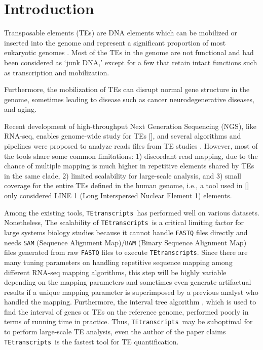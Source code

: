 \documentclass[wsdraft]{ws-procs11x85}
\newcommand{\TEtranscripts}{\texttt{TEtranscripts}}
\begin{document}
\bodymatter

\section{Introduction}\label{aba:intro}

Transposable elements (TEs) are DNA elements which can be mobilized or inserted into the genome and represent a significant proportion of most eukaryotic genomes \cite{erwin2014mobile}. 
Most of the TEs in the genome are not functional and had been considered as `junk DNA,' except for a few that retain intact functions such as transcription and mobilization.\cite{biemont2006genetics}

Furthermore, the mobilization of TEs can disrupt normal gene structure in the genome, sometimes leading to disease such as cancer \cite{belancio2008mammalian,jirtle2007environmental} neurodegenerative diseases,\cite{erwin2014mobile} and aging.\cite{wood2013chromatin} 

Recent development of high-throughput Next Generation Sequencing (NGS), like RNA-seq, enables genome-wide study for TEs [], and several algorithms and pipelines were proposed to analyze reads files from TE studies \cite{lee2012landscape,platzer2012te,helman2014somatic,henaff2015jitterbug,jin2015tetranscripts,de2017identifying,tang2017human}. However, most of the tools share some common limitations: 1) discordant read mapping, due to the chance of multiple mapping is much higher in repetitive elements shared by TEs in the same clade, 2) limited scalability for large-scale analysis, and 3) small coverage for the entire TEs defined in the human genome, i.e., a tool used in [] only considered LINE 1 (Long Interspersed Nuclear Element 1) elements.\cite{ewing2015transposable} 

Among the existing tools, \TEtranscripts~has performed well on various datasets.\cite{jin2015tetranscripts}
Nonetheless, The scalability of \TEtranscripts~is a critical limiting factor for large systems biology studies because it cannot handle \verb|FASTQ| files directly and needs \verb|SAM| (Sequence Alignment Map)/\verb|BAM| (Binary Sequence Alignment Map) files generated from raw \verb|FASTQ| files to execute \TEtranscripts. Since there are many tuning parameters on handling repetitive sequence mapping among different RNA-seq mapping algorithms, this step will be highly variable depending on the mapping parameters and sometimes even generate artifactual results if a unique mapping parameter is superimposed by a previous analyst who handled the mapping. 
Furthermore, the interval tree algorithm \cite{samet1990design}, which is used to find the interval of genes or TEs on the reference genome,  performed poorly in terms of running time in practice. Thus, \TEtranscripts~may be suboptimal for to perform large-scale TE analysis, even the author of the paper claims \TEtranscripts~is the fastest tool for TE quantification.
\end{document}
